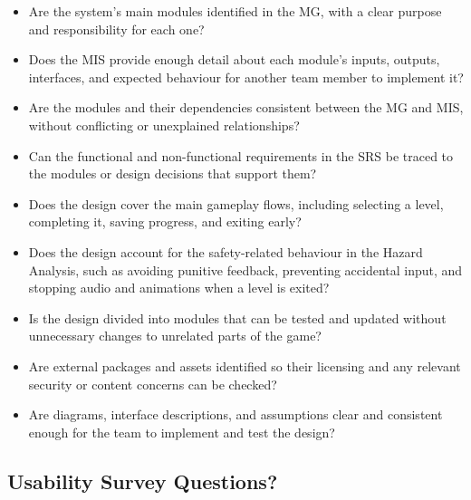 \documentclass[10pt,titlepage]{article}
\begin{document}
\begin{itemize}[label={$\square$}, leftmargin=*, itemsep=0.35em]
    \item Are the system's main modules identified in the MG, with a clear
    purpose and responsibility for each one?

    \item Does the MIS provide enough detail about each module's inputs,
    outputs, interfaces, and expected behaviour for another team member to
    implement it?

    \item Are the modules and their dependencies consistent between the MG
    and MIS, without conflicting or unexplained relationships?

    \item Can the functional and non-functional requirements in the SRS be
    traced to the modules or design decisions that support them?

    \item Does the design cover the main gameplay flows, including selecting
    a level, completing it, saving progress, and exiting early?

    \item Does the design account for the safety-related behaviour in the
    Hazard Analysis, such as avoiding punitive feedback, preventing accidental
    input, and stopping audio and animations when a level is exited?

    \item Is the design divided into modules that can be tested and updated
    without unnecessary changes to unrelated parts of the game?

    \item Are external packages and assets identified so their licensing and
    any relevant security or content concerns can be checked?

    \item Are diagrams, interface descriptions, and assumptions clear and
    consistent enough for the team to implement and test the design?
\end{itemize}

\subsection{Usability Survey Questions?}


\newpage{}
\end{document}
